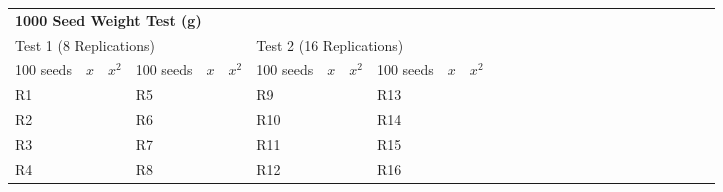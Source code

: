 \begin{tabular}{|llllllllllll|llllllllllllllll}
\cline{1-12}
\multicolumn{12}{|l|}{\textbf{1000 Seed Weight Test (g)}} &
   &
   &
   &
   &
   &
   &
   &
   &
   &
   &
   &
   &
   &
   &
   &
   \\ \cline{1-12}
\multicolumn{6}{|l|}{Test 1 (8 Replications)} &
  \multicolumn{6}{l|}{Test 2 (16 Replications)} &
   &
   &
   &
   &
   &
   &
   &
   &
   &
   &
   &
   &
   &
   &
   &
   \\ \cline{1-12}
\multicolumn{1}{|l|}{100 seeds} &
  \multicolumn{1}{l|}{$x$} &
  \multicolumn{1}{l|}{$x^2$} &
  \multicolumn{1}{l|}{100 seeds} &
  \multicolumn{1}{l|}{$x$} &
  \multicolumn{1}{l|}{$x^2$} &
  \multicolumn{1}{l|}{100 seeds} &
  \multicolumn{1}{l|}{$x$} &
  \multicolumn{1}{l|}{$x^2$} &
  \multicolumn{1}{l|}{100 seeds} &
  \multicolumn{1}{l|}{$x$} &
  $x^2$ &
   &
   &
   &
   &
   &
   &
   &
   &
   &
   &
   &
   &
   &
   &
   &
   \\ \cline{1-12}
\multicolumn{1}{|l|}{R1} &
  \multicolumn{1}{l|}{} &
  \multicolumn{1}{l|}{} &
  \multicolumn{1}{l|}{R5} &
  \multicolumn{1}{l|}{} &
  \multicolumn{1}{l|}{} &
  \multicolumn{1}{l|}{R9} &
  \multicolumn{1}{l|}{} &
  \multicolumn{1}{l|}{} &
  \multicolumn{1}{l|}{R13} &
  \multicolumn{1}{l|}{} &
   &
   &
   &
   &
   &
   &
   &
   &
   &
   &
   &
   &
   &
   &
   &
   &
   \\ \cline{1-12}
\multicolumn{1}{|l|}{R2} &
  \multicolumn{1}{l|}{} &
  \multicolumn{1}{l|}{} &
  \multicolumn{1}{l|}{R6} &
  \multicolumn{1}{l|}{} &
  \multicolumn{1}{l|}{} &
  \multicolumn{1}{l|}{R10} &
  \multicolumn{1}{l|}{} &
  \multicolumn{1}{l|}{} &
  \multicolumn{1}{l|}{R14} &
  \multicolumn{1}{l|}{} &
   &
   &
   &
   &
   &
   &
   &
   &
   &
   &
   &
   &
   &
   &
   &
   &
   \\ \cline{1-12}
\multicolumn{1}{|l|}{R3} &
  \multicolumn{1}{l|}{} &
  \multicolumn{1}{l|}{} &
  \multicolumn{1}{l|}{R7} &
  \multicolumn{1}{l|}{} &
  \multicolumn{1}{l|}{} &
  \multicolumn{1}{l|}{R11} &
  \multicolumn{1}{l|}{} &
  \multicolumn{1}{l|}{} &
  \multicolumn{1}{l|}{R15} &
  \multicolumn{1}{l|}{} &
   &
   &
   &
   &
   &
   &
   &
   &
   &
   &
   &
   &
   &
   &
   &
   &
   \\ \cline{1-12}
\multicolumn{1}{|l|}{R4} &
  \multicolumn{1}{l|}{} &
  \multicolumn{1}{l|}{} &
  \multicolumn{1}{l|}{R8} &
  \multicolumn{1}{l|}{} &
  \multicolumn{1}{l|}{} &
  \multicolumn{1}{l|}{R12} &
  \multicolumn{1}{l|}{} &
  \multicolumn{1}{l|}{} &
  \multicolumn{1}{l|}{R16} &
  \multicolumn{1}{l|}{} &

\end{tabular}
